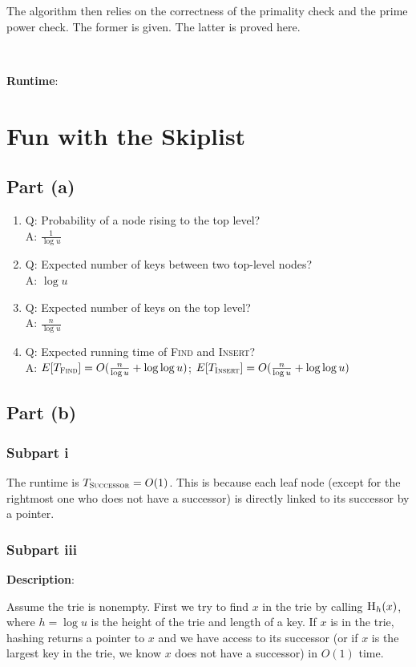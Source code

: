 \documentclass{article}
\begin{document}
The algorithm then relies on the correctness of the primality check and the prime power check. The former is given. The latter is proved here.

~

\noindent\textbf{Runtime}:



\section{Fun with the Skiplist}
\subsection{Part (a)}
\begin{enumerate}
\item{Q: Probability of a node rising to the top level?\\A: $\frac{1}{\log u}$}
\item{Q: Expected number of keys between two top-level nodes?\\A: $\log u$}
\item{Q: Expected number of keys on the top level?\\A: $\frac{n}{\log u}$}
\item{Q: Expected running time of \textsc{Find} and \textsc{Insert}?\\A: $E[T_{\textsc{Find}}]=O(\frac{n}{\log u}+\log\log u)$; $E[T_{\textsc{Insert}}]=O(\frac{n}{\log u}+\log\log u)$}
\end{enumerate}

\subsection{Part (b)}
\subsubsection{Subpart i}
The runtime is $T_{\textsc{Successor}}=O(1)$. This is because each leaf node (except for the rightmost one who does not have a successor) is directly linked to its successor by a pointer.

\subsubsection{Subpart iii}
\noindent\textbf{Description}:

Assume the trie is nonempty. First we try to find $x$ in the trie by calling $\textsc{H}_h(x)$, where $h=\log u$ is the height of the trie and length of a key. If $x$ is in the trie, hashing returns a pointer to $x$ and we have access to its successor (or if $x$ is the largest key in the trie, we know $x$ does not have a successor) in $O(1)$ time.
\end{document}
